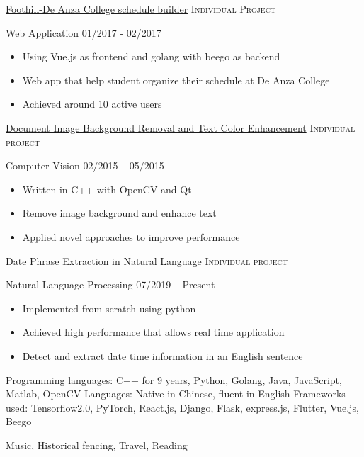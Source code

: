 \documentclass[10pt,a4paper]{article}
\begin{document}
\vspace{0.5em}
\headedsection
  {\href{https://github.com/itzMeerkat/FHDAClassViewer}{Foothill-De Anza College schedule builder}}
  {\textsc{Individual Project}} {
  \headedsubsection
    {Web Application}
    {01/2017 - 02/2017}
    {\begin{itemize}
      \item Using Vue.js as frontend and golang with beego as backend
      \item Web app that help student organize their schedule at De Anza College
      \item Achieved around 10 active users
    \end{itemize}}
  }

\vspace{0.5em}
\headedsection
  {\href{https://github.com/itzMeerkat/PrintableNote}{Document Image Background Removal and Text Color Enhancement}}
  {\textsc{Individual project}} {
    \headedsubsection
    {Computer Vision}
    {02/2015 -- 05/2015}
    {\begin{itemize}
      \item Written in C++ with OpenCV and Qt
      \item Remove image background and enhance text
      \item Applied novel approaches to improve performance
    \end{itemize}}
}

\vspace{0.5em}
\headedsection
  {\href{https://github.com/itzMeerkat/ambiguous-date-picker}{Date Phrase Extraction in Natural Language}}
  {\textsc{Individual project}} {
    \headedsubsection
    {Natural Language Processing}
    {07/2019 -- Present}
    {\begin{itemize}
      \item Implemented from scratch using python
      \item Achieved high performance that allows real time application
      \item Detect and extract date time information in an English sentence
    \end{itemize}}
}

\vspace{0.5em}
\spacedhrule{0em}{-0.4em}



\inlineheadsection
  {Programming languages:}
  {C++ for 9 years, Python, Golang, Java, JavaScript, Matlab, OpenCV}
  \vspace{0.5em}
\inlineheadsection
  {Languages:}
  {Native in Chinese, fluent in English}
  \vspace{0.5em}
\inlineheadsection
  {Frameworks used:}
  {Tensorflow2.0, PyTorch, React.js, Django, Flask, express.js, Flutter, Vue.js, Beego}
  \vspace{0.5em}

\spacedhrule{1.6em}{-0.4em}


\inlineheadsection
  {}
  {Music, Historical fencing, Travel, Reading}
\end{document}
